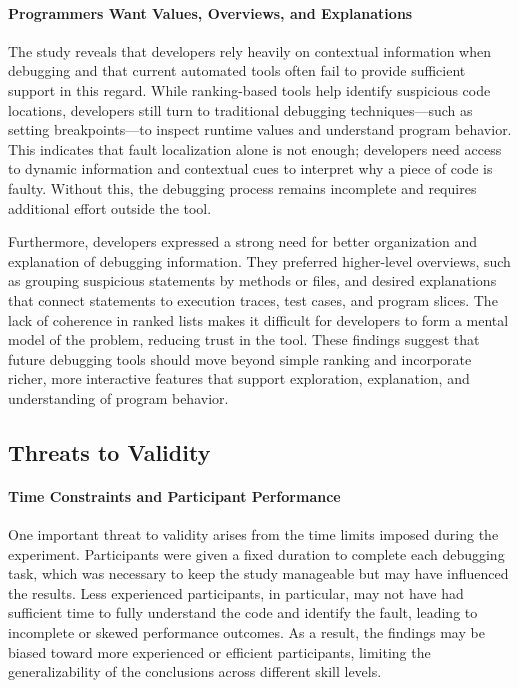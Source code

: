 \paragraph{Programmers Want Values, Overviews, and Explanations}

The study reveals that developers rely heavily on contextual information when debugging and that current automated tools often fail to provide sufficient support in this regard. While ranking-based tools help identify suspicious code locations, developers still turn to traditional debugging techniques—such as setting breakpoints—to inspect runtime values and understand program behavior. This indicates that fault localization alone is not enough; developers need access to dynamic information and contextual cues to interpret why a piece of code is faulty. Without this, the debugging process remains incomplete and requires additional effort outside the tool.

Furthermore, developers expressed a strong need for better organization and explanation of debugging information. They preferred higher-level overviews, such as grouping suspicious statements by methods or files, and desired explanations that connect statements to execution traces, test cases, and program slices. The lack of coherence in ranked lists makes it difficult for developers to form a mental model of the problem, reducing trust in the tool. These findings suggest that future debugging tools should move beyond simple ranking and incorporate richer, more interactive features that support exploration, explanation, and understanding of program behavior.

\subsection{Threats to Validity}

\paragraph{Time Constraints and Participant Performance}
One important threat to validity arises from the time limits imposed during the experiment. Participants were given a fixed duration to complete each debugging task, which was necessary to keep the study manageable but may have influenced the results. Less experienced participants, in particular, may not have had sufficient time to fully understand the code and identify the fault, leading to incomplete or skewed performance outcomes. As a result, the findings may be biased toward more experienced or efficient participants, limiting the generalizability of the conclusions across different skill levels.

